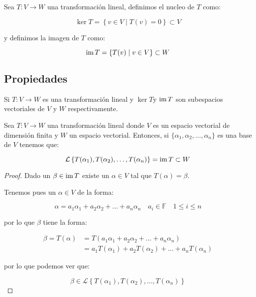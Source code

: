 		\begin{definicion}
			Sea $T \colon V \to W$ una transformación lineal, definimos el nucleo de $T$ como:

			\begin{equation}
				\ker{T} = \left\{ v \in V \mid T(v) = 0 \right\} \subset V
			\end{equation}

			y definimos la imagen de $T$ como:

			\begin{equation}
				\operatorname{im}{T} = \left\{ T(v) \mid v \in V \right\} \subset W
			\end{equation}
		\end{definicion}
	\newpage
	\subsection{Propiedades}

		\begin{proposicion}
			Si $T \colon V \to W$ es una transformación lineal y $\ker{T}$y $\operatorname{im}{T}$ son subespacios vectoriales de $V$ y $W$ respectivamente.
		\end{proposicion}

		\begin{proposicion}
			Sea $T \colon V \to W$ una transformación lineal donde $V$ es un espacio vectorial de dimensión finita y $W$ un espacio vectorial.
			Entonces, si $\{ \alpha_1, \alpha_2, \dots, \alpha_n \}$ es una base de $V$ tenemos que:

			\begin{equation}
				\mathcal{L} \left\{ T(\alpha_1), T(\alpha_2), \dots, T(\alpha_n) \right\} = \operatorname{im}{T} \subset W
			\end{equation}
		\end{proposicion}

		\begin{proof}
			Dado un $\beta \in \operatorname{im}{T}$ existe un $\alpha \in V$ tal que $T(\alpha) = \beta$.

			Tenemos pues un $\alpha \in V$ de la forma:

			\begin{equation*}
				\alpha = a_1 \alpha_1 + a_2 \alpha_2 + \dots + a_n \alpha_n \quad a_i \in \mathbb{F} \quad 1 \leq i \leq n
			\end{equation*}

			por lo que $\beta$ tiene la forma:

			\begin{align*}
				\beta = T(\alpha) &= T(a_1 \alpha_1 + a_2 \alpha_2 + \dots + a_n \alpha_n) \\
				&= a_1 T(\alpha_1) + a_2 T(\alpha_2) + \dots + a_n T(\alpha_n)
			\end{align*}

			por lo que podemos ver que:

			\begin{equation*}
				\beta \in \mathcal{L} \left\{ T(\alpha_1), T(\alpha_2), \dots, T(\alpha_n) \right\}
			\end{equation*}
		\end{proof}

